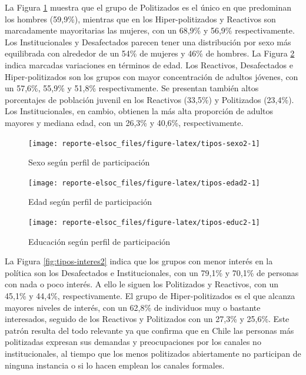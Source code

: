 \documentclass[
  12pt,
]{book}
\begin{document}
La Figura \ref{fig:tipos-sexo2} muestra que el grupo de Politizados es el único en que predominan los hombres (59,9\%), mientras que en los Hiper-politizados y Reactivos son marcadamente mayoritarias las mujeres, con un 68,9\% y 56,9\% respectivamente. Los Institucionales y Desafectados parecen tener una distribución por sexo más equilibrada con alrededor de un 54\% de mujeres y 46\% de hombres. La Figura \ref{fig:tipos-edad2} indica marcadas variaciones en términos de edad. Los Reactivos, Desafectados e Hiper-politizados son los grupos con mayor concentración de adultos jóvenes, con un 57,6\%, 55,9\% y 51,8\% respectivamente. Se presentan también altos porcentajes de población juvenil en los Reactivos (33,5\%) y Politizados (23,4\%). Los Institucionales, en cambio, obtienen la más alta proporción de adultos mayores y mediana edad, con un 26,3\% y 40,6\%, respectivamente.

\begin{figure}

{\centering \texttt{[image: reporte-elsoc\_files/figure-latex/tipos-sexo2-1]} 

}

\caption{Sexo según perfil de participación}\label{fig:tipos-sexo2}
\end{figure}

\begin{figure}

{\centering \texttt{[image: reporte-elsoc\_files/figure-latex/tipos-edad2-1]} 

}

\caption{Edad según perfil de participación}\label{fig:tipos-edad2}
\end{figure}

\begin{figure}

{\centering \texttt{[image: reporte-elsoc\_files/figure-latex/tipos-educ2-1]} 

}

\caption{Educación según perfil de participación}\label{fig:tipos-educ2}
\end{figure}

La Figura \ref{fig:tipos-interes2} indica que los grupos con menor interés en la política son los Desafectados e Institucionales, con un 79,1\% y 70,1\% de personas con nada o poco interés. A ello le siguen los Politizados y Reactivos, con un 45,1\% y 44,4\%, respectivamente. El grupo de Hiper-politizados es el que alcanza mayores niveles de interés, con un 62,8\% de individuos muy o bastante interesados, seguido de los Reactivos y Politizados con un 27,3\% y 25,6\%. Este patrón resulta del todo relevante ya que confirma que en Chile las personas más politizadas expresan sus demandas y preocupaciones por los canales no institucionales, al tiempo que los menos politizados abiertamente no participan de ninguna instancia o si lo hacen emplean los canales formales.
\end{document}
